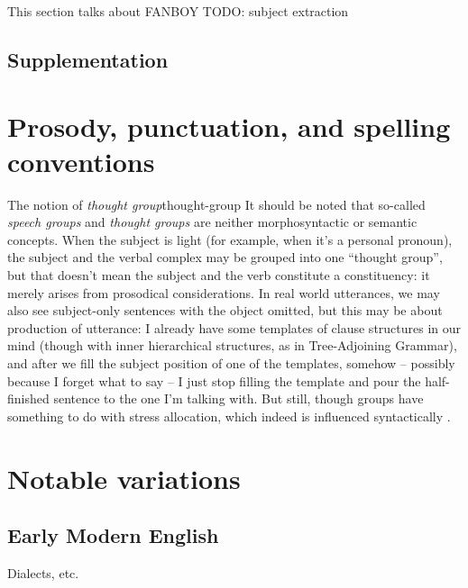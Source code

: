 \documentclass[UTF8, a4paper, oneside, scheme=plain, 12pt]{ctexbook}
\newcommand*{\citepage}[1]{p.~{#1}}
\newcommand*{\term}[1]{\emph{#1}}
\begin{document}
This section talks about FANBOY
TODO: subject extraction

\section{Supplementation}\label{sec:clause-linking.supplementation}


\chapter{Prosody, punctuation, and spelling conventions}

\begin{infobox}{The notion of \term{thought group}}{thought-group}
    It should be noted that so-called \term{speech groups}
    and \term{thought groups}
    are neither morphosyntactic or semantic concepts.
    When the subject is light (for example, when it's a personal pronoun),
    the subject and the verbal complex may be grouped into one ``thought group'',
    but that doesn't mean the subject and the verb constitute a constituency:
    it merely arises from prosodical considerations.
    In real world utterances, 
    we may also see subject-only sentences with the object omitted,
    but this may be about production of utterance:
    I already have some templates of clause structures in our mind
    (though with inner hierarchical structures, as in Tree-Adjoining Grammar),
    and after we fill the subject position of one of the templates,
    somehow -- possibly because I forget what to say -- 
    I just stop filling the template and pour the half-finished sentence 
    to the one I'm talking with.
    But still, though groups have something to do with stress allocation,
    which indeed is influenced syntactically \citep[\citepage{7}]{kahnemuyipour2009syntax}. 
\end{infobox}

\chapter{Notable variations}

\section{Early Modern English}

Dialects, etc.




\end{document}
